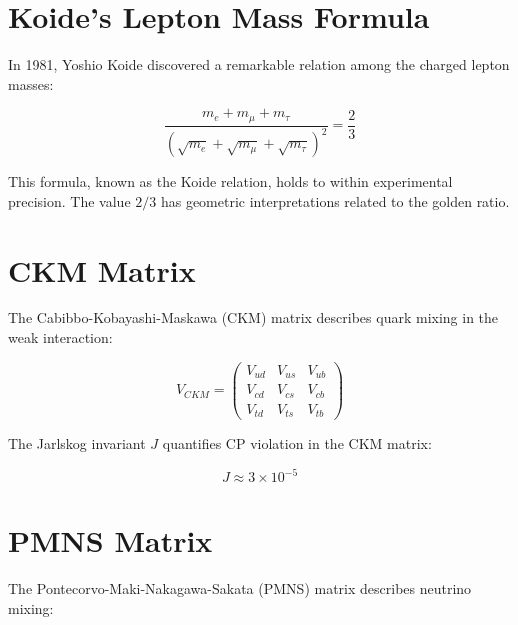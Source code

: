 \section{Koide's Lepton Mass Formula}

In 1981, Yoshio Koide discovered a remarkable relation among the charged lepton masses:

\begin{equation}
\frac{m_e + m_\mu + m_\tau}{(\sqrt{m_e} + \sqrt{m_\mu} + \sqrt{m_\tau})^2} = \frac{2}{3}
\end{equation}

This formula, known as the Koide relation, holds to within experimental precision. The value $2/3$ has geometric interpretations related to the golden ratio.

\section{CKM Matrix}

The Cabibbo-Kobayashi-Maskawa (CKM) matrix describes quark mixing in the weak interaction:

\begin{equation}
V_{CKM} = \begin{pmatrix}
V_{ud} & V_{us} & V_{ub} \\
V_{cd} & V_{cs} & V_{cb} \\
V_{td} & V_{ts} & V_{tb}
\end{pmatrix}
\end{equation}

The Jarlskog invariant $J$ quantifies CP violation in the CKM matrix:

\begin{equation}
J \approx 3\times10^{-5}
\end{equation}

\section{PMNS Matrix}

The Pontecorvo-Maki-Nakagawa-Sakata (PMNS) matrix describes neutrino mixing:

